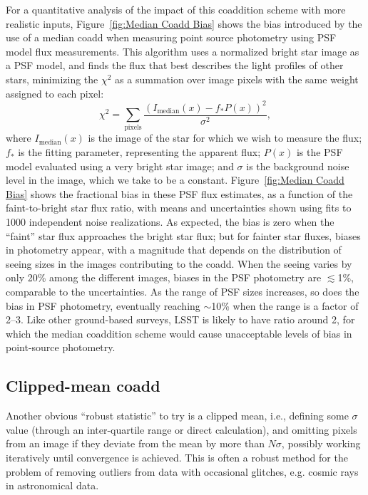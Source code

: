 \documentclass{aastex63}
\newcommand{\irresponse}[1]{{#1}}
\begin{document}
For a quantitative analysis of the impact of this coaddition scheme with more realistic inputs, Figure~\ref{fig:Median Coadd Bias} shows the bias introduced by the use of a median coadd when measuring point source photometry using PSF model flux measurements.
This algorithm uses a normalized bright star image as a PSF model, and finds the flux that best  describes the light profiles of other stars, minimizing the $\chi^2$ as a summation over image pixels with the same weight assigned to each pixel:
\begin{equation}
\chi^2 = \sum_\text{pixels} \frac{(I_\text{median}(x)-f_*P(x))^2}{\sigma^2},
\end{equation} 
where \irresponse{$I_\text{median}(x)$} is the image of the star for which we wish to measure the flux; $f_*$ is the fitting parameter, representing the apparent flux; $P(x)$ is the PSF model evaluated using a very bright star image; and  $\sigma$ is the background noise level in the image, which we take to be a constant.   Figure~\ref{fig:Median Coadd Bias} shows the fractional bias in these PSF flux estimates, as a function of the faint-to-bright star flux ratio, with means and uncertainties shown using fits to 1000 independent noise realizations.  
As expected, the bias is zero when the ``faint'' star flux approaches the bright star flux; but for fainter star fluxes,  biases in photometry appear, with a magnitude that depends on the distribution of seeing sizes in the images contributing to the coadd. When the seeing varies by only 20\% among the different images, biases in the PSF photometry are $\lesssim$1\%, comparable to the uncertainties. As the range of PSF sizes increases, so does the bias in PSF photometry, eventually reaching $\sim$10\% when the range is a factor of 2--3. Like other ground-based surveys, LSST is likely to have ratio around 2, for which the median coaddition scheme would cause unacceptable levels of bias in point-source photometry.


\subsection{Clipped-mean coadd}

Another obvious ``robust statistic'' to try is a clipped mean, i.e., defining some $\sigma$ value (through an \irresponse{inter-quartile range} or direct calculation), and omitting pixels from an image if they deviate from the mean by more than $N\sigma$, possibly working iteratively until convergence is achieved.
\irresponse{This is often a robust method for the problem of removing outliers from data with occasional glitches, e.g. cosmic rays in astronomical data.}
\end{document}
